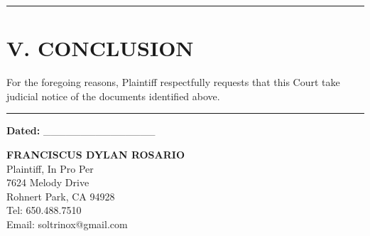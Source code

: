 \begin{center}\rule{0.5\linewidth}{0.5pt}\end{center}

\section{V. CONCLUSION}\label{v.-conclusion}

For the foregoing reasons, Plaintiff respectfully requests that this Court take judicial notice of the documents identified above.

\begin{center}\rule{0.5\linewidth}{0.5pt}\end{center}

\textbf{Dated:} \_\_\_\_\_\_\_\_\_\_\_\_\_\_\_

\textbf{FRANCISCUS DYLAN ROSARIO}\\
Plaintiff, In Pro Per\\
7624 Melody Drive\\
Rohnert Park, CA 94928\\
Tel: 650.488.7510\\
Email: soltrinox@gmail.com

\nolinenumbers



